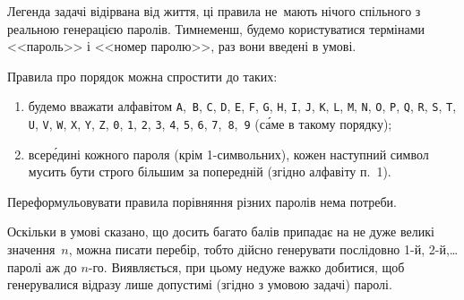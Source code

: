 \Tutorial	Легенда задачі відірвана від життя, ці правила не~мають нічого спільного з реальною генерацією паролів. Тим\nolinebreak[2] не\nolinebreak[3] менш, будемо користуватися термінами <<пароль>> і <<номер паролю>>, раз вони введені в умові.

Правила про порядок можна спростити до таких:
\begin{enumerate}
\item
будемо вважати алфавітом \texttt{A},~\texttt{B}, \texttt{C}, \texttt{D}, \texttt{E}, \texttt{F}, \texttt{G}, \texttt{H}, \texttt{I}, \texttt{J}, \texttt{K}, \texttt{L}, \texttt{M}, \texttt{N}, \texttt{O}, \texttt{P}, \texttt{Q}, \texttt{R}, \texttt{S}, \texttt{T}, \texttt{U}, \texttt{V}, \texttt{W}, \texttt{X}, \texttt{Y}, \texttt{Z}, \texttt{0}, \texttt{1}, \texttt{2}, \texttt{3}, \texttt{4}, \texttt{5}, \texttt{6}, \texttt{7},~\texttt{8},~\texttt{9} (с\'{а}ме в такому порядку);
\item
всер\'{е}дині кожного пароля (крім 1-символьних), кожен наступний символ мусить бути строго більшим за попередній (згідно алфавіту п.~1).
\end{enumerate}
Переформульовувати правила порівняння різних паролів нема потреби.

Оскільки в умові сказано, що досить багато балів припадає на не дуже великі значення~$n$, можна писати перебір, тобто дійсно генерувати послідовно \mbox{1-й}, \mbox{2-й},\nolinebreak[3] \dots{} паролі аж до $n$-го. Виявляється, при цьому не\nolinebreak[3] дуже важко добитися, щоб генерувалися відразу лише допустимі (згідно з умовою задачі) паролі.

